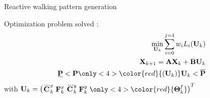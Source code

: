 \begin{frame}{Reactive walking pattern generation }
  \begin{minipage}{0.48\textwidth}
    Optimization problem solved :
    \vspace*{-0.3cm}
    \begin{equation*}
      \begin{aligned}
        \min_{{\bf U}_k} 
        \sum_{i=0}^{j=4} w_i L_i({\bf U}_{k}) & \\
        {\bf X}_{k+1} = {\bf A}{\bf X}_{k} + {\bf B} {\bf U}_k & \\
        \underline{\bf P} < {\bf P}\only<4>{{\color{red}{({\bf U}_k)}}} {\bf U}_k  < \overline{\bf P}& \\
      \end{aligned}
    \end{equation*}
    with ${\bf U}_k=\begin{pmatrix} \dddot{\bf C}^x_k \; {\bf F}^x_k\; \dddot{\bf C}^y_k \;{\bf F}^y_k \;\only<4>{\color{red}{{\bf \Theta}_k^\mathit{f}}}\end{pmatrix}^T$ \\
  \end{minipage}
  \begin{minipage}{0.48\textwidth}
  \end{minipage}\\
  \vspace*{-0.5cm}
  \begin{center}
  \end{center}
  

\end{frame}
